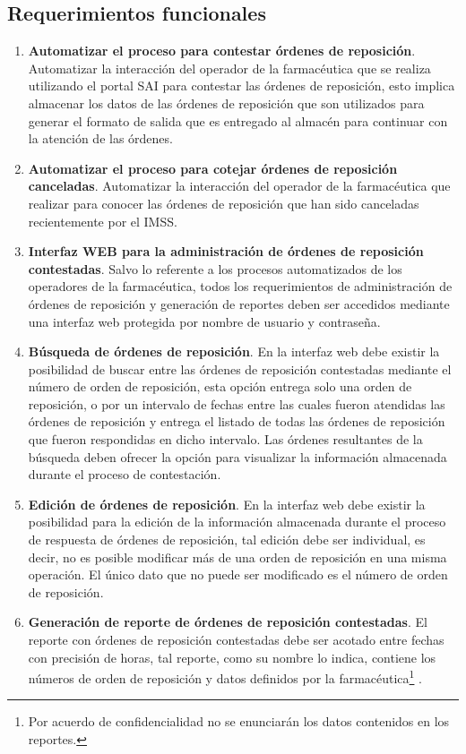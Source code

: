 \subsection{Requerimientos funcionales}
\begin{enumerate}
\item \textbf{Automatizar el proceso para contestar órdenes de reposición}. Automatizar la interacción del operador de la farmacéutica que se realiza utilizando el portal SAI para contestar las órdenes de reposición, esto implica almacenar los datos de las órdenes de reposición que son utilizados para generar el formato de salida que es entregado al almacén para continuar con la atención de las órdenes.
\item \textbf{Automatizar el proceso para cotejar órdenes de reposición canceladas}. Automatizar la interacción del operador de la farmacéutica que realizar para conocer las órdenes de reposición que han sido canceladas recientemente por el IMSS.
\item \textbf{Interfaz WEB para la administración de órdenes de reposición contestadas}. Salvo lo referente a los procesos automatizados de los operadores de la farmacéutica, todos los requerimientos de administración de órdenes de reposición y generación de reportes deben ser accedidos mediante una interfaz web protegida por nombre de usuario y contraseña. 
\item \textbf{Búsqueda de órdenes de reposición}. En la interfaz web debe existir la posibilidad de buscar entre las órdenes de reposición contestadas mediante el número de orden de reposición, esta opción entrega solo una orden de reposición, o por un intervalo de fechas entre las cuales fueron atendidas las órdenes de reposición y entrega el listado de todas las órdenes de reposición que fueron respondidas en dicho intervalo. Las órdenes resultantes de la búsqueda deben ofrecer la opción para visualizar la información almacenada durante el proceso de contestación.
\item \textbf{Edición de órdenes de reposición}. En la interfaz web debe existir la posibilidad para la edición de la información almacenada durante el proceso de respuesta de órdenes de reposición, tal edición debe ser individual, es decir, no es posible modificar más de una orden de reposición en una misma operación. El único dato que no puede ser modificado es el número de orden de reposición.
\item \textbf{Generación de reporte de órdenes de reposición contestadas}. El reporte con órdenes de reposición contestadas debe ser acotado entre fechas con precisión de horas, tal reporte, como su nombre lo indica, contiene los números de orden de reposición y datos definidos por la farmacéutica\footnote{Por acuerdo de confidencialidad no se enunciarán los datos contenidos en los reportes.} .

\end{enumerate}
